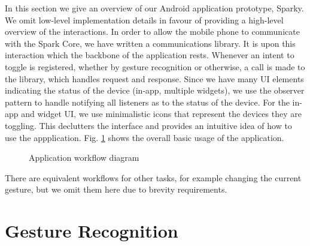 \documentclass[journal]{IEEEtran}
\begin{document}
In this section we give an overview of our Android application prototype, Sparky. We omit low-level implementation details in favour of providing a high-level overview of the interactions. In order to allow the mobile phone to communicate with the Spark Core, we have written a communications library. It is upon this interaction which the backbone of the application rests. Whenever an intent to toggle is registered, whether by gesture recognition or otherwise, a call is made to the library, which handles request and response. Since we have many UI elements indicating the status of the device (in-app, multiple widgets), we use the observer pattern to handle notifying all listeners as to the status of the device. For the in-app and widget UI, we use minimalistic icons that represent the devices they are toggling. This declutters the interface and provides an intuitive idea of how to use the appplication. Fig. \ref{fig1} shows the overall basic usage of the application.

\begin{figure}[!t]
\centering
\caption{Application workflow diagram}
\label{fig1}
\end{figure}



There are equivalent workflows for other tasks, for example changing the current gesture, but we omit them here due to brevity requirements. 

\section{Gesture Recognition}
\end{document}
